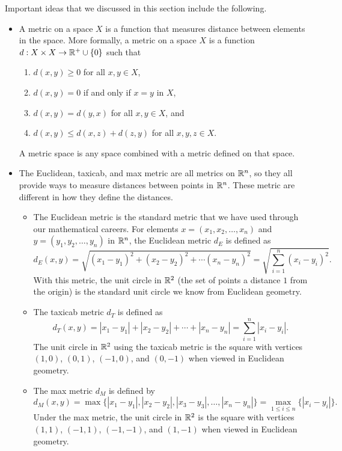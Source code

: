 {\label{sec_metric_space_summ}
Important ideas that we discussed in this section include the following.
\begin{itemize}
\item A metric on a space $X$ is a function that measures distance between elements in the space. More formally, a metric on a space $X$ is a function $d: X \times X \to \mathbb{R}^+ \cup \{0\}$ such that 
	\begin{enumerate}
	\item $d(x,y) \geq 0$ for all $x,y \in X$,
	\item $d(x,y) = 0$ if and only if $x = y$ in $X$,
	\item $d(x,y) = d(y,x)$ for all $x, y \in X$, and
	\item $d(x,y) \leq d(x,z) + d(z,y)$ for all $x,y,z \in X$.
	\end{enumerate}
A metric space is any space combined with a metric defined on that space.

\item The Euclidean, taxicab, and max metric are all metrics on $\mathbb{R}^n$, so they all provide ways to measure distances between points in $\mathbb{R}^n$. These metric are different in how they define the distances. 

	\begin{itemize}
	\item The Euclidean metric is the standard metric that we have used through our mathematical careers. For elements $x = (x_1, x_2, \ldots, x_n)$ and $y = (y_1, y_2, \ldots, y_n)$ in $\mathbb{R}^n$, the Euclidean metric $d_E$ is defined as
\[d_E(x,y) =  \sqrt{(x_1-y_1)^2 + (x_2-y_2)^2 + \cdots (x_n-y_n)^2} = \sqrt{\sum_{i=1}^n (x_i-y_i)^2}.\]
With this metric, the unit circle in $\mathbb{R}^2$ (the set of points a distance $1$ from the origin) is the standard unit circle we know from Euclidean geometry. 

	\item The taxicab metric $d_T$ is defined as
\[d_T(x,y) = |x_1-y_1| + |x_2-y_2| + \cdots + |x_n-y_n| = \sum_{i=1}^n |x_i-y_i|.\]
The unit circle in $\mathbb{R}^2$ using the taxicab metric is the square with vertices $(1,0)$, $(0,1)$, $(-1,0)$, and $(0,-1)$ when viewed in Euclidean geometry. 

	\item The max metric $d_M$ is defined by 
\[d_M(x,y) = \max\{| x_1-y_1 |, | x_2-y_2 |, |x_3-y_3|, \ldots, |x_n-y_n| \} = \max_{1 \leq i \leq n} \{|x_i-y_i|\}.\]
Under the max metric, the unit circle in $\mathbb{R}^2$ is the square with vertices $(1,1)$, $(-1,1)$, $(-1,-1)$, and $(1,-1)$ when viewed in Euclidean geometry.


\end{itemize}
\end{itemize}}
